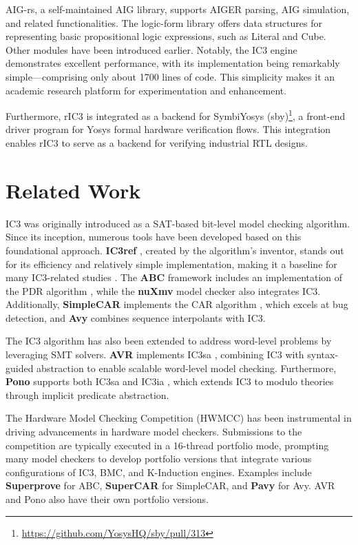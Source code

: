 \documentclass[runningheads]{llncs}
\begin{document}
AIG-rs, a self-maintained AIG library, supports AIGER parsing, AIG simulation, and related functionalities. The logic-form library offers data structures for representing basic propositional logic expressions, such as Literal and Cube. Other modules have been introduced earlier. Notably, the IC3 engine demonstrates excellent performance, with its implementation being remarkably simple—comprising only about 1700 lines of code. This simplicity makes it an academic research platform for experimentation and enhancement.

Furthermore, rIC3 is integrated as a backend for SymbiYosys (sby)\footnote[1]{\href{https://github.com/YosysHQ/sby/pull/313}{https://github.com/YosysHQ/sby/pull/313}}, a front-end driver program for Yosys formal hardware verification flows. This integration enables rIC3 to serve as a backend for verifying industrial RTL designs.

\section{Related Work}
IC3 was originally introduced as a SAT-based bit-level model checking algorithm. Since its inception, numerous tools have been developed based on this foundational approach. \textbf{IC3ref} \cite{IC3ref}, created by the algorithm’s inventor, stands out for its efficiency and relatively simple implementation, making it a baseline for many IC3-related studies \cite{DeepIC3,Progress,PredictingLemma,IGoodLemma}. The \textbf{ABC} framework \cite{ABC} includes an implementation of the PDR algorithm \cite{PDR}, while the \textbf{nuXmv} model checker \cite{NUXMV} also integrates IC3. Additionally, \textbf{SimpleCAR} \cite{SimpleCAR} implements the CAR algorithm \cite{CAR}, which excels at bug detection, and \textbf{Avy} \cite{Avy} combines sequence interpolants with IC3.

The IC3 algorithm has also been extended to address word-level problems by leveraging SMT solvers. \textbf{AVR} \cite{AVR} implements IC3sa \cite{IC3SA}, combining IC3 with syntax-guided abstraction to enable scalable word-level model checking. Furthermore, \textbf{Pono} \cite{PONO} supports both IC3sa and IC3ia \cite{IC3IA}, which extends IC3 to modulo theories through implicit predicate abstraction.

The Hardware Model Checking Competition (HWMCC) \cite{HWMCC} has been instrumental in driving advancements in hardware model checkers. Submissions to the competition are typically executed in a 16-thread portfolio mode, prompting many model checkers to develop portfolio versions that integrate various configurations of IC3, BMC, and K-Induction engines. Examples include \textbf{Superprove} \cite{SuperProve} for ABC, \textbf{SuperCAR} \cite{SuperCAR} for SimpleCAR, and \textbf{Pavy} \cite{Pavy} for Avy. AVR and Pono also have their own portfolio versions.
\end{document}
